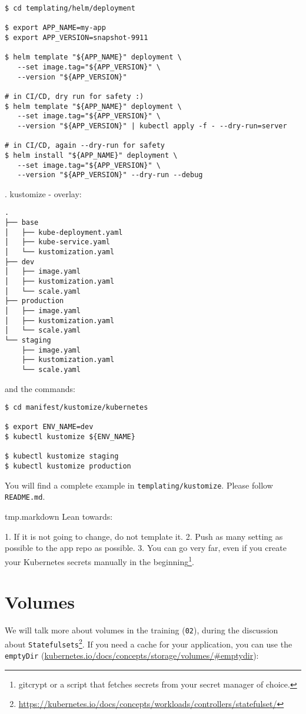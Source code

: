 \documentclass[12pt, letterpaper]{article}
\newenvironment{markdown}%
    {\VerbatimEnvironment\begin{VerbatimOut}{tmp.markdown}}%
    {\end{VerbatimOut}%
        \immediate\write18{pandoc tmp.markdown -t latex -o tmp.tex}%
        }
\begin{document}
\begin{verbatim}
$ cd templating/helm/deployment

$ export APP_NAME=my-app
$ export APP_VERSION=snapshot-9911

$ helm template "${APP_NAME}" deployment \
   --set image.tag="${APP_VERSION}" \
   --version "${APP_VERSION}"

# in CI/CD, dry run for safety :)
$ helm template "${APP_NAME}" deployment \
   --set image.tag="${APP_VERSION}" \
   --version "${APP_VERSION}" | kubectl apply -f - --dry-run=server

# in CI/CD, again --dry-run for safety
$ helm install "${APP_NAME}" deployment \
   --set image.tag="${APP_VERSION}" \
   --version "${APP_VERSION}" --dry-run --debug
\end{verbatim}

\pagebreak
2. kustomize - overlay:

\begin{verbatim}
.
├── base
│   ├── kube-deployment.yaml
│   ├── kube-service.yaml
│   └── kustomization.yaml
├── dev
│   ├── image.yaml
│   ├── kustomization.yaml
│   └── scale.yaml
├── production
│   ├── image.yaml
│   ├── kustomization.yaml
│   └── scale.yaml
└── staging
    ├── image.yaml
    ├── kustomization.yaml
    └── scale.yaml
\end{verbatim}

and the commands:

\begin{verbatim}
$ cd manifest/kustomize/kubernetes

$ export ENV_NAME=dev
$ kubectl kustomize ${ENV_NAME}

$ kubectl kustomize staging
$ kubectl kustomize production
\end{verbatim}

You will find a complete example in \texttt{templating/kustomize}. Please follow \texttt{README.md}.

\bigskip
\begin{markdown}
Lean towards:

1. If it is not going to change, do not template it.
2. Push as many setting as possible to the app repo as possible.
3. You can go very far, even if you create your Kubernetes secrets manually in the beginning\footnote{gitcrypt or a script that fetches secrets from your secret manager of choice.}.
\end{markdown}

\section{Volumes}
We will talk more about volumes in the training (\verb|02|), during the discussion about \verb|Statefulsets|\footnote{\url{https://kubernetes.io/docs/concepts/workloads/controllers/statefulset/}}. If you need a cache for your application, you can use the \verb|emptyDir| 
(\href{https://kubernetes.io/docs/concepts/storage/volumes/#emptydir}{kubernetes.io/docs/concepts/storage/volumes/\#emptydir}):
\end{document}
